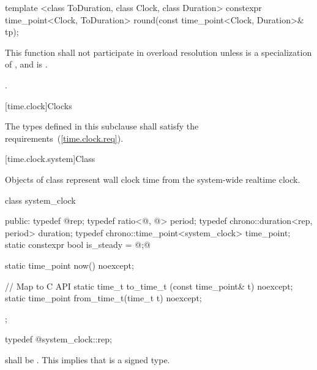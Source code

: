 %
%
\begin{itemdecl}
template <class ToDuration, class Clock, class Duration>
  constexpr time_point<Clock, ToDuration>
  round(const time_point<Clock, Duration>& tp);
\end{itemdecl}

\begin{itemdescr}
\pnum
\remarks This function shall not participate in overload resolution
unless  is a specialization of , and
 is .

\pnum
\returns {}.
\end{itemdescr}

[time.clock]{Clocks}

\pnum
The types defined in this subclause shall satisfy the
requirements~(\ref{time.clock.req}).

[time.clock.system]{Class }

\pnum
Objects of class  represent wall clock time from the system-wide
realtime clock.

\begin{codeblock}
class system_clock {
public:
  typedef @\seebelow@                          rep;
  typedef ratio<@\unspec@, @\unspec@>  period;
  typedef chrono::duration<rep, period>       duration;
  typedef chrono::time_point<system_clock>    time_point;
  static constexpr bool is_steady =           @\unspec;@

  static time_point now() noexcept;

  // Map to C API
  static time_t      to_time_t  (const time_point& t) noexcept;
  static time_point  from_time_t(time_t t) noexcept;
};
\end{codeblock}

%
%
\begin{itemdecl}
typedef @\unspec@ system_clock::rep;
\end{itemdecl}

\begin{itemdescr}
\pnum
\requires {} shall
be . \enternote This implies that  is a signed type. \exitnote
\end{itemdescr}

